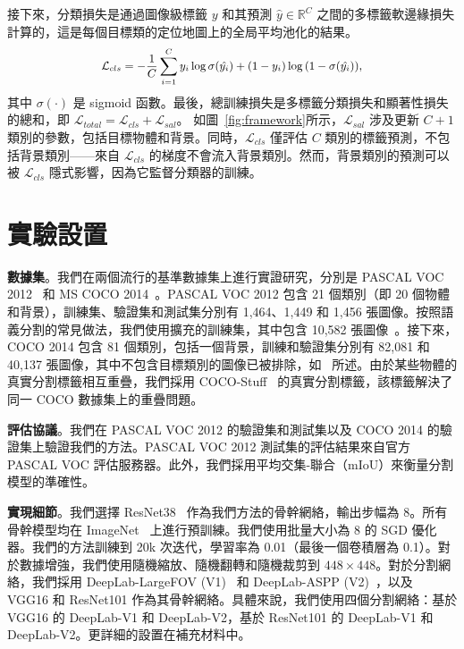 \documentclass[final]{cvpr}
\begin{document}
接下來，分類損失是通過圖像級標籤 $y$ 和其預測 $\hat{y} \in \mathbb{R}^C$ 之間的多標籤軟邊緣損失計算的，這是每個目標類的定位地圖上的全局平均池化的結果。\vspace{-1mm}
\begin{equation}
{\small
\begin{split}
\label{loss_cls}
\mathcal{L}_{cls}= - \frac{1}{C} \sum_{i=1}^{C} y_i \log{\sigma(\hat{y_i})} + (1-y_i) \log{(1 - \sigma(\hat{y_i}))},
\end{split}}\vspace{-1mm}
\end{equation}
\noindent 其中 $\sigma(\cdot)$ 是 sigmoid 函數。最後，總訓練損失是多標籤分類損失和顯著性損失的總和，即 $\mathcal{L}_{total} = \mathcal{L}_{cls} + \mathcal{L}_{sal}$。
如圖~\ref{fig:framework}所示，$\mathcal{L}_{sal}$ 涉及更新 $C+1$ 類別的參數，包括目標物體和背景。同時，$\mathcal{L}_{cls}$ 僅評估 $C$ 類別的標籤預測，不包括背景類別——來自 $\mathcal{L}_{cls}$ 的梯度不會流入背景類別。然而，背景類別的預測可以被 $\mathcal{L}_{cls}$ 隱式影響，因為它監督分類器的訓練。

\section{實驗設置}
\noindent
\textbf{數據集}。我們在兩個流行的基準數據集上進行實證研究，分別是 PASCAL VOC 2012~\cite{everingham2015pascal} 和 MS COCO 2014~\cite{lin2014microsoft}。PASCAL VOC 2012 包含 21 個類別（即 20 個物體和背景），訓練集、驗證集和測試集分別有 1,464、1,449 和 1,456 張圖像。按照語義分割的常見做法，我們使用擴充的訓練集，其中包含 10,582 張圖像~\cite{hariharan2011semantic}。接下來，COCO 2014 包含 81 個類別，包括一個背景，訓練和驗證集分別有 82,081 和 40,137 張圖像，其中不包含目標類別的圖像已被排除，如~\cite{choe2020attention} 所述。由於某些物體的真實分割標籤相互重疊，我們採用 COCO-Stuff~\cite{caesar2018coco} 的真實分割標籤，該標籤解決了同一 COCO 數據集上的重疊問題。

\vspace{0.5mm}
\noindent
\textbf{評估協議}。我們在 PASCAL VOC 2012 的驗證集和測試集以及 COCO 2014 的驗證集上驗證我們的方法。PASCAL VOC 2012 測試集的評估結果來自官方 PASCAL VOC 評估服務器。此外，我們採用平均交集-聯合（mIoU）來衡量分割模型的準確性。

\vspace{0.5mm}
\noindent
\textbf{實現細節}。我們選擇 ResNet38~\cite{wu2019wider} 作為我們方法的骨幹網絡，輸出步幅為 8。所有骨幹模型均在 ImageNet~\cite{deng2009imagenet} 上進行預訓練。我們使用批量大小為 8 的 SGD 優化器。我們的方法訓練到 20k 次迭代，學習率為 0.01（最後一個卷積層為 0.1）。對於數據增強，我們使用隨機縮放、隨機翻轉和隨機裁剪到 $448 \times 448$。對於分割網絡，我們採用 DeepLab-LargeFOV (V1)~\cite{chen2014semantic} 和 DeepLab-ASPP (V2)~\cite{chen2017deeplab}，以及 VGG16 和 ResNet101 作為其骨幹網絡。具體來說，我們使用四個分割網絡：基於 VGG16 的 DeepLab-V1 和 DeepLab-V2，基於 ResNet101 的 DeepLab-V1 和 DeepLab-V2。更詳細的設置在補充材料中。
\end{document}

